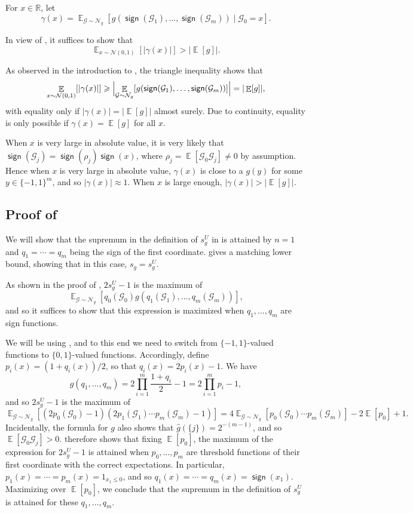 \documentclass{article}
\theoremstyle{definition}
\theoremstyle{remark}
\DeclareMathOperator*{\E}{\mathbb{E}}
\providecommand{\cG}{\mathcal{G}}
\providecommand{\normal}{\mathcal{N}}
\providecommand{\normalg}[1]{\normal_{#1}}
\providecommand{\stdnormal}{\normal(0,1)}
\DeclareMathOperator{\sgn}{\mathsf{sign}}
\renewcommand\geq{\geqslant}
\renewcommand\leq{\leqslant}
\begin{document}
For $x \in \mathbb{R}$, let
\[
 \gamma(x) = \E_{\cG \sim \normalg{g}}[g(\sgn(\cG_1),\ldots,\sgn(\cG_m)) \mid \cG_0 = x].
\]

In view of , it suffices to show that
\[
 \E_{x \sim \stdnormal}[|\gamma(x)|] > |\E[g]|.
\]

As observed in the introduction to , the triangle inequality shows that
\[
 \E_{x \sim \stdnormal}[|\gamma(x)|] \geq
 \Bigl| \E_{\cG \sim \normalg{g}}[g(\sgn(\cG_1),\ldots,\sgn(\cG_m))] \Bigr| = |\E[g]|,
\]
with equality only if $|\gamma(x)| = |\E[g]|$ almost surely. Due to continuity, equality is only possible if $\gamma(x) = \E[g]$ for all $x$.

When $x$ is very large in absolute value, it is very likely that $\sgn(\cG_j) = \sgn(\rho_j) \sgn(x)$, where $\rho_j = \E[\cG_0 \cG_j] \neq 0$ by assumption. Hence when $x$ is very large in absolute value, $\gamma(x)$ is close to a $g(y)$ for some $y \in \{-1,1\}^m$, and so $|\gamma(x)| \approx 1$. When $x$ is large enough, $|\gamma(x)| > |\E[g]|$.

\subsection{Proof of }

We will show that the supremum in the definition of $s_g^U$ in  is attained by $n = 1$ and $q_1 = \cdots = q_m$ being the sign of the first coordinate.  gives a matching lower bound, showing that in this case, $s_g = s_g^U$.

\smallskip

As shown in the proof of , $2s_g^U - 1$ is the maximum of
\[
 \E_{\mathcal{G} \sim \normalg{g}}[q_0(\mathcal{G}_0) g(q_1(\mathcal{G}_1),\ldots,q_m(\mathcal{G}_m))],
\]
and so it suffices to show that this expression is maximized when $q_1,\ldots,q_m$ are sign functions.

We will be using , and to this end we need to switch from $\{-1,1\}$-valued functions to $\{0,1\}$-valued functions. Accordingly, define $p_i(x) = (1+q_i(x))/2$, so that $q_i(x) = 2p_i(x) - 1$. We have
\[
 g(q_1,\ldots,q_m) = 2 \prod_{i=1}^m \frac{1+q_i}{2} - 1 = 2\prod_{i=1}^m p_i - 1,
\]
and so $2s_g^U - 1$ is the maximum of
\[
 \E_{\mathcal{G} \sim \normalg{g}}[(2p_0(\mathcal{G}_0)-1)(2p_1(\mathcal{G}_1)\cdots p_m(\mathcal{G}_m)-1)] =
 4\E_{\mathcal{G} \sim \normalg{g}}[p_0(\mathcal{G}_0) \cdots p_m(\mathcal{G}_m)] - 2\E[p_0] + 1.
\]
Incidentally, the formula for $g$ also shows that $\hat{g}(\{j\}) = 2^{-(m-1)}$, and so $\E[\mathcal{G}_0 \mathcal{G}_j] > 0$.
 therefore shows that fixing $\E[p_0]$, the maximum of the expression for $2s_g^U - 1$ is attained when $p_0,\ldots,p_m$ are threshold functions of their first coordinate with the correct expectations. In particular, $p_1(x) = \cdots = p_m(x) = 1_{x_1 \leq 0}$, and so $q_1(x) = \cdots = q_m(x) = \sgn(x_1)$. Maximizing over $\E[p_0]$, we conclude that the supremum in the definition of $s_g^U$ is attained for these $q_1,\ldots,q_m$.
\end{document}
